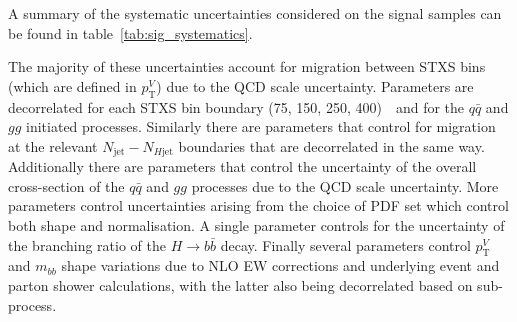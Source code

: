 A summary of the systematic uncertainties considered on the signal samples can
be found in table~\ref{tab:sig_systematics}.

The majority of these uncertainties account for migration between STXS bins
(which are defined in $p_{\mathrm{T}}^V$) due to the QCD scale uncertainty.
Parameters are decorrelated for each STXS bin boundary (75, 150, 250, 400)~\GeV\
and for the $q\bar{q}$ and $gg$ initiated processes. Similarly there are
parameters that control for migration at the relevant $N_{\text{jet}} -
N_{H\text{jet}}$ boundaries that are decorrelated in the same way. Additionally
there are parameters that control the uncertainty of the overall cross-section
of the $q\bar{q}$ and $gg$ processes due to the QCD scale uncertainty. More
parameters control uncertainties arising from the choice of PDF set which
control both shape and normalisation. A single parameter controls for the
uncertainty of the branching ratio of the $H \to b{\bar{b}}$ decay. Finally
several parameters control  $p_{\mathrm{T}}^V$ and $m_{bb}$ shape variations due
to NLO EW corrections and underlying event and parton shower calculations, with
the latter also being decorrelated based on sub-process.